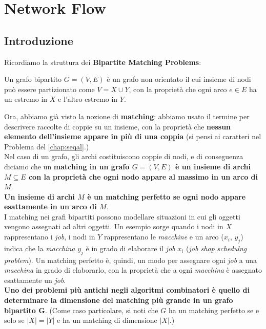 \chapter{Network Flow}

\section{Introduzione}

Ricordiamo la struttura dei \textbf{Bipartite Matching Problems}:
\begin{myblockquote}
	Un grafo bipartito $G = (V , E)$ è un grafo non
	orientato il cui insieme di nodi può essere partizionato come
	$V = X \cup Y$, con la proprietà che ogni arco $e \in E$ ha un
	estremo in $X$ e l'altro estremo in $Y$.
\end{myblockquote}

Ora, abbiamo già visto la nozione di \textbf{matching}: abbiamo usato il
termine per descrivere raccolte di coppie su un insieme, con la
proprietà che \textbf{nessun elemento dell'insieme appare in più di una
	coppia} (si pensi ai caratteri nel Problema del
\protect\autoref{chap:seqal}.)\\

Nel caso di un grafo, gli archi costituiscono coppie di nodi, e di
conseguenza diciamo che un \textbf{matching in un grafo $G = (V , E)$
	è un insieme di archi $M \subseteq E$ con la proprietà che ogni nodo
	appare al massimo in un arco di $M$}.\\

\textbf{Un insieme di archi $M$ è un matching perfetto se ogni nodo
	appare esattamente in un arco di $M$}.\\

I matching nei grafi bipartiti possono modellare situazioni in cui gli
oggetti vengono assegnati ad altri oggetti. Un esempio sorge quando i
nodi in $X$ rappresentano i \emph{job}, i nodi in $Y$ rappresentano
le \emph{macchine} e un arco ($x_i$, $y_j$) indica che la
\emph{macchina} $y_j$ è in grado di elaborare il \emph{job} $x_i$
(\emph{job shop schedulng problem}). Un matching perfetto è, quindi, un
modo per assegnare ogni \emph{job} a una \emph{macchina} in grado di
elaborarlo, con la proprietà che a ogni \emph{macchina} è assegnato
esattamente un \emph{job}.\\

\textbf{Uno dei problemi più antichi negli algoritmi combinatori è
	quello di determinare la dimensione del matching più grande in un grafo
	bipartito G}. (Come caso particolare, si noti che $G$ ha un matching
perfetto se e solo se $|X| = |Y|$ e ha un matching di dimensione
$|X|$.)\\

